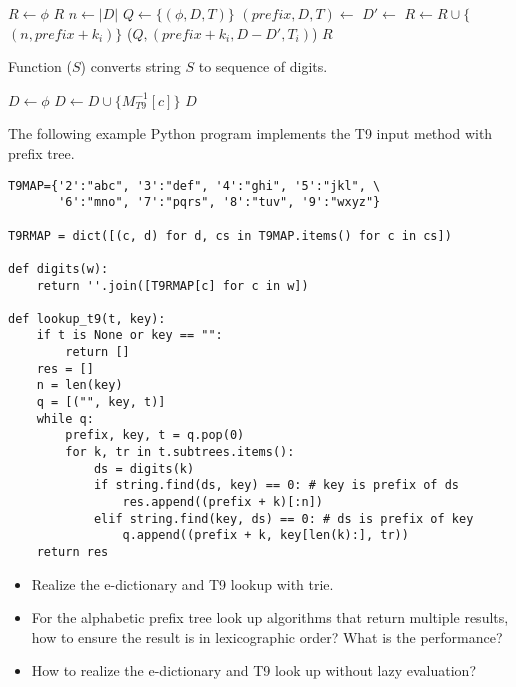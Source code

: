 \documentclass{article}
\begin{document}
\begin{algorithmic}[1]
  \State $R \gets \phi$
    \State \Return $R$
  \EndIf
  \State $n \gets |D|$
  \State $Q \gets \{(\phi, D, T)\}$
    \State $(prefix, D, T) \gets$ 
      \State $D' \gets$ 
       
        \State $R \gets R \cup \{$  $(n, prefix + k_i) \}$ 
        \State {}($Q, (prefix + k_i, D - D', T_i)$)
      \EndIf
    \EndFor
  \EndWhile
  \State \Return $R$
\EndFunction
\end{algorithmic}

Function ($S$) converts string $S$ to sequence of digits.

\begin{algorithmic}[1]
  \State $D \gets \phi$
    \State $D \gets D \cup \{M^{-1}_{T9}[c]\}$
  \EndFor
  \State \Return $D$
\EndFunction
\end{algorithmic}

The following example Python program implements the T9 input method with prefix tree.

\lstset{language=Python}
\begin{lstlisting}
T9MAP={'2':"abc", '3':"def", '4':"ghi", '5':"jkl", \
       '6':"mno", '7':"pqrs", '8':"tuv", '9':"wxyz"}

T9RMAP = dict([(c, d) for d, cs in T9MAP.items() for c in cs])

def digits(w):
    return ''.join([T9RMAP[c] for c in w])

def lookup_t9(t, key):
    if t is None or key == "":
        return []
    res = []
    n = len(key)
    q = [("", key, t)]
    while q:
        prefix, key, t = q.pop(0)
        for k, tr in t.subtrees.items():
            ds = digits(k)
            if string.find(ds, key) == 0: # key is prefix of ds
                res.append((prefix + k)[:n])
            elif string.find(key, ds) == 0: # ds is prefix of key
                q.append((prefix + k, key[len(k):], tr))
    return res
\end{lstlisting}


\begin{Exercise}
\begin{itemize}
\item Realize the e-dictionary and T9 lookup with trie.
\item For the alphabetic prefix tree look up algorithms that return multiple results, how to ensure the result is in lexicographic order? What is the performance?
\item How to realize the e-dictionary and T9 look up without lazy evaluation?
\end{itemize}
\end{Exercise}
\end{document}
